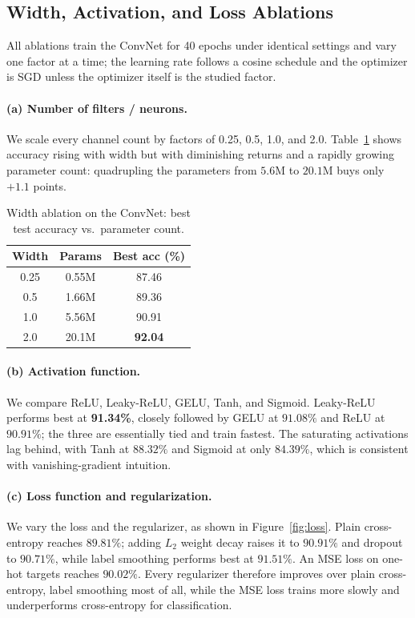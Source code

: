 \documentclass[11pt]{article}
\begin{document}
\subsection{Width, Activation, and Loss Ablations}
\label{sec:ablation}
All ablations train the ConvNet for 40 epochs under identical settings and
vary one factor at a time; the learning rate follows a cosine schedule and the
optimizer is SGD unless the optimizer itself is the studied factor.

\paragraph{(a) Number of filters / neurons.}
We scale every channel count by factors of 0.25, 0.5, 1.0, and 2.0.
Table~\ref{tab:width} shows accuracy rising with width but with diminishing
returns and a rapidly growing parameter count:
quadrupling the parameters from $5.6$M to $20.1$M buys only $+1.1$ points.

\begin{table}[htbp]
\centering
\caption{Width ablation on the ConvNet: best test accuracy vs.\ parameter count.}
\label{tab:width}
\begin{tabular}{ccc}
\toprule
Width & Params & Best acc (\%) \\
\midrule
0.25 & 0.55M & 87.46 \\
0.5  & 1.66M & 89.36 \\
1.0  & 5.56M & 90.91 \\
2.0  & 20.1M & \textbf{92.04} \\
\bottomrule
\end{tabular}
\end{table}

\paragraph{(b) Activation function.}
We compare ReLU, Leaky-ReLU, GELU, Tanh, and Sigmoid. Leaky-ReLU performs best
at \textbf{91.34\%}, closely followed by GELU at $91.08\%$ and ReLU at
$90.91\%$; the three are essentially tied and train fastest. The saturating
activations lag behind, with Tanh at $88.32\%$ and Sigmoid at only
$84.39\%$, which is consistent with vanishing-gradient intuition.

\paragraph{(c) Loss function and regularization.}
We vary the loss and the regularizer, as shown in Figure~\ref{fig:loss}.
Plain cross-entropy reaches $89.81\%$; adding $L_2$ weight decay raises it to
$90.91\%$ and dropout to $90.71\%$, while label smoothing performs best at
$\mathbf{91.51\%}$. An MSE loss on one-hot targets reaches $90.02\%$. Every
regularizer therefore improves over plain cross-entropy, label smoothing most
of all, while the MSE loss trains more slowly and underperforms cross-entropy
for classification.
\end{document}
